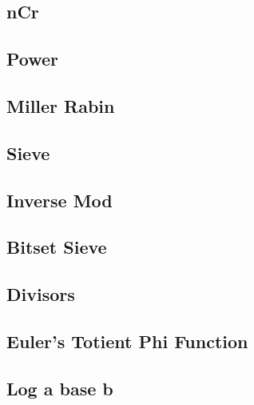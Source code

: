 \documentclass[10pt, a4paper]{article}
\begin{document}
\begin{multicols}{2}
\subsection{nCr}


\subsection{Power}


\subsection{Miller Rabin}


\subsection{Sieve}


\subsection{Inverse Mod}


\subsection{Bitset Sieve}


\subsection{Divisors}


\subsection{Euler's Totient Phi Function}


\subsection{Log a base b}



\end{multicols}
\end{document}
